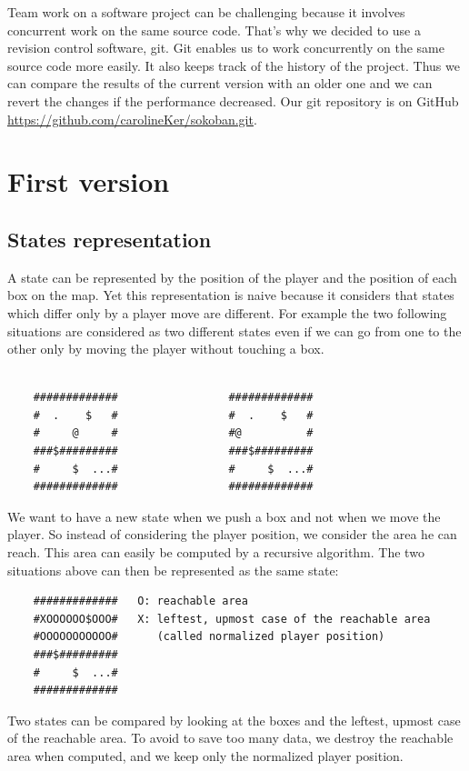 \documentclass[a4paper,10pt]{article}
\begin{document}
	Team work on a software project can be challenging because it involves concurrent work on the same source code. 
	That's why we decided to use a revision control software, git. 
	Git enables us to work concurrently on the same source code more easily.
	It also keeps track of the history of the project.
	Thus we can compare the results of the current version with an older one
	and we can revert the changes if the performance decreased.
	Our git repository is on GitHub \url{https://github.com/carolineKer/sokoban.git}.

      

\section{First version}
	\subsection{States representation}
	A state can be represented by the position of the player and the position of each box on the map. 
	Yet this representation is naive because it considers that states which differ only by a player move are different.
	For example the two following situations are considered as two different states even if we can go from one to the other only by moving the 
	player without touching a box.
	\begin{verbatim}

	#############                 #############
	#  .    $   #                 #  .    $   #
	#     @     #                 #@          #
	###$#########                 ###$#########
	#     $  ...#                 #     $  ...#
	#############                 #############

	\end{verbatim}


	We want to have a new state when we push a box and not when we move the player.
	So instead of considering the player position, we consider the area he can reach.
	This area can easily be computed by a recursive algorithm.
	The two situations above can then be represented as the same state:
	\newpage
	\begin{verbatim}
	#############   O: reachable area
	#XOOOOOO$OOO#   X: leftest, upmost case of the reachable area 
	#OOOOOOOOOOO#      (called normalized player position)
	###$#########
	#     $  ...#
	#############

	\end{verbatim}
	Two states can be compared by looking at the boxes and the leftest, upmost case of the reachable area.
	To avoid to save too many data, we destroy the reachable area when computed, and we keep only the normalized player position.
	
\end{document}
